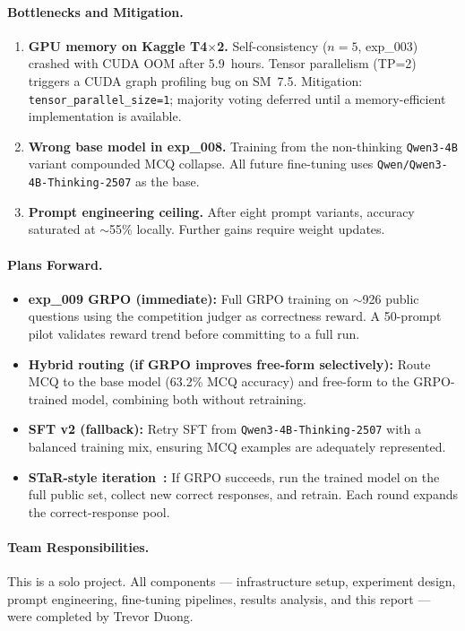 \documentclass{article}
\begin{document}
\paragraph{Bottlenecks and Mitigation.}
\begin{enumerate}
  \item \textbf{GPU memory on Kaggle T4$\times$2.} Self-consistency ($n{=}5$, exp\_003) crashed with CUDA OOM after 5.9~hours. Tensor parallelism (TP=2) triggers a CUDA graph profiling bug on SM~7.5. Mitigation: \texttt{tensor\_parallel\_size=1}; majority voting deferred until a memory-efficient implementation is available.
  \item \textbf{Wrong base model in exp\_008.} Training from the non-thinking \texttt{Qwen3-4B} variant compounded MCQ collapse. All future fine-tuning uses \texttt{Qwen/Qwen3-4B-Thinking-2507} as the base.
  \item \textbf{Prompt engineering ceiling.} After eight prompt variants, accuracy saturated at ${\sim}$55\% locally. Further gains require weight updates.
\end{enumerate}

\paragraph{Plans Forward.}
\begin{itemize}
  \item \textbf{exp\_009 GRPO (immediate):} Full GRPO training on ${\sim}$926 public questions using the competition judger as correctness reward. A 50-prompt pilot validates reward trend before committing to a full run.
  \item \textbf{Hybrid routing (if GRPO improves free-form selectively):} Route MCQ to the base model (63.2\% MCQ accuracy) and free-form to the GRPO-trained model, combining both without retraining.
  \item \textbf{SFT v2 (fallback):} Retry SFT from \texttt{Qwen3-4B-Thinking-2507} with a balanced training mix, ensuring MCQ examples are adequately represented.
  \item \textbf{STaR-style iteration~\cite{zelikman2022star}:} If GRPO succeeds, run the trained model on the full public set, collect new correct responses, and retrain. Each round expands the correct-response pool.
\end{itemize}

\paragraph{Team Responsibilities.}
This is a solo project. All components --- infrastructure setup, experiment design, prompt engineering, fine-tuning pipelines, results analysis, and this report --- were completed by Trevor Duong.
\end{document}
